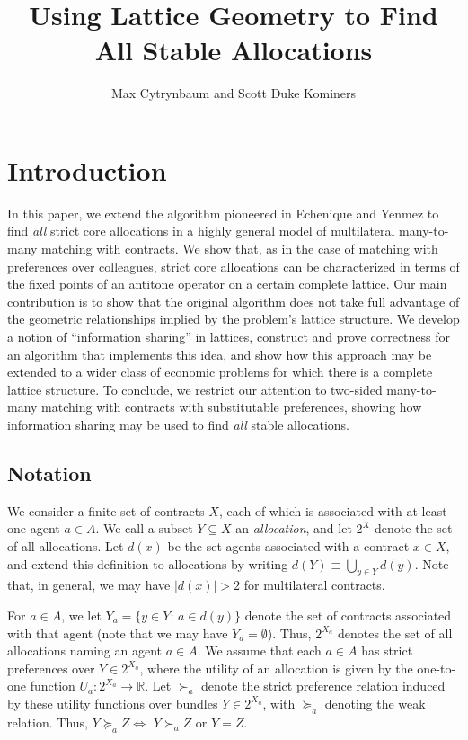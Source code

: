 \documentclass[11pt,reqno]{amsart}
\title{Using Lattice Geometry to Find All Stable Allocations}
\author{Max Cytrynbaum and Scott Duke Kominers}
\theoremstyle{definition}
\numberwithin{equation}{section}
\newcommand{\mr}{\mathbb{R}}
\newcommand{\sub}{\subseteq}
\newcommand{\suq}{\succeq}
\newcommand{\su}{\succ}
\begin{document}
\maketitle

\section{Introduction}

In this paper, we extend the algorithm pioneered in Echenique and Yenmez to find \emph{all} strict core allocations in a highly general model of multilateral many-to-many matching with contracts.
We show that, as in the case of matching with preferences over colleagues, strict core allocations can be characterized in terms of the fixed points of an antitone operator on a certain complete lattice.
Our main contribution is to show that the original algorithm does not take full advantage of the geometric relationships implied by the problem's lattice structure.
We develop a notion of ``information sharing'' in lattices, construct and prove correctness for an algorithm that implements this idea, and show how this approach may be extended to a wider class of economic problems for which there is a complete lattice structure. 
To conclude, we restrict our attention to two-sided many-to-many matching with contracts with substitutable preferences, showing how information sharing may be used to find \emph{all} stable allocations.

\subsection{Notation}
We consider a finite set of contracts $X$, each of which is associated with at least one agent $a\in A$. 
We call a subset $Y\sub X$ an \emph{allocation}, and let $2^X$ denote the set of all allocations. 
Let $d(x)$ be the set agents associated with a contract $x\in X$, and extend this definition to allocations by writing $d(Y) \equiv \bigcup_{y\in Y} d(y)$.
Note that, in general, we may have $|d(x)| > 2$ for multilateral contracts.

For $a\in A$, we let $Y_a = \{y\in Y: \, a\in d(y)\}$ denote the set of contracts associated with that agent (note that we may have $Y_a = \emptyset$). Thus, $2^{X_a}$ denotes the set of all allocations naming an agent $a\in A$. 
We assume that each $a\in A$ has strict preferences over $Y \in 2^{X_a}$, where the utility of an allocation is given by the one-to-one function $U_a: 2^{X_a} \to \mr$.
Let $\su_a$ denote the strict preference relation induced by these utility functions over bundles $Y \in 2^{X_a}$, with $\suq_a$ denoting the weak relation. Thus, $Y \suq_a  Z \iff$ $Y \su_a Z$ or $Y = Z$.
\end{document}
